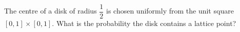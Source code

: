 The centre of a disk of radius $\dfrac{1}{2}$ is chosen uniformly from the unit square $[0,1]\times[0,1]$. What is the probability the disk contains a lattice point?
